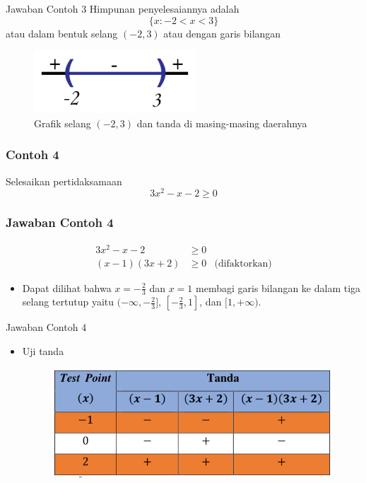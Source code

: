 \documentclass[pdflatex,compress,mathserif]{beamer}
\begin{document}
		\begin{frame}{Jawaban Contoh 3}
			Himpunan penyelesaiannya adalah
			$$ \{x: -2 < x < 3\} $$
			atau dalam bentuk selang $ (-2,3) $ atau dengan garis bilangan
			\begin{figure}
				\centering
				\includegraphics[width=0.3\linewidth]{pict/14}
				\caption{Grafik selang $ (-2,3) $ dan tanda di masing-masing daerahnya}
				\label{fig:14}
			\end{figure}
		\end{frame}
	
		\begin{frame}
			\frametitle{Contoh 4}
			Selesaikan pertidaksamaan
			\begin{equation*}
				3x^2 - x - 2 \geq 0
			\end{equation*}
		\end{frame}
	
		\begin{frame}
			\frametitle{Jawaban Contoh 4}
			\begin{align*}
				3x^2 - x - 2 &\geq 0 &\\
				(x-1)(3x+2) &\geq 0 & \text{(difaktorkan)}
			\end{align*}
			\begin{itemize}
				\item Dapat dilihat bahwa $ x = -\frac{2}{3}$ dan $ x = 1 $ membagi garis bilangan ke dalam tiga selang tertutup yaitu $ (-\infty, -\frac{2}{3}] $, $ [-\frac{2}{3} , 1] $, dan $ [1, +\infty) $.
			\end{itemize}
		\end{frame}
	
		\begin{frame}{Jawaban Contoh 4}
			\begin{itemize}
				\item Uji tanda
				\begin{figure}
					\centering
					\includegraphics[width=0.7\linewidth]{pict/15}
				\end{figure}
			\end{itemize}
		\end{frame}
	
\end{document}

